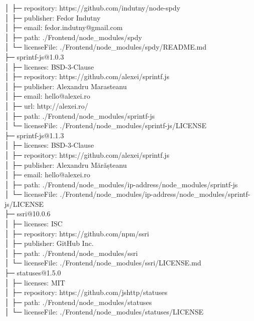 \documentclass[
    paper=a4,
    twoside=false,
    parskip=half,
    listof=entryprefix,
    listof=totoc,
    index=totoc,
    bibliography=totoc,
    headsepline,
]{scrbook}
\begin{document}
    │  ├─ repository: https://github.com/indutny/node-spdy\\
    │  ├─ publisher: Fedor Indutny\\
    │  ├─ email: fedor.indutny@gmail.com\\
    │  ├─ path: ./Frontend/node\_modules/spdy\\
    │  └─ licenseFile: ./Frontend/node\_modules/spdy/README.md\\
    ├─ sprintf-js@1.0.3\\
    │  ├─ licenses: BSD-3-Clause\\
    │  ├─ repository: https://github.com/alexei/sprintf.js\\
    │  ├─ publisher: Alexandru Marasteanu\\
    │  ├─ email: hello@alexei.ro\\
    │  ├─ url: http://alexei.ro/\\
    │  ├─ path: ./Frontend/node\_modules/sprintf-js\\
    │  └─ licenseFile: ./Frontend/node\_modules/sprintf-js/LICENSE\\
    ├─ sprintf-js@1.1.3\\
    │  ├─ licenses: BSD-3-Clause\\
    │  ├─ repository: https://github.com/alexei/sprintf.js\\
    │  ├─ publisher: Alexandru Mărășteanu\\
    │  ├─ email: hello@alexei.ro\\
    │  ├─ path: ./Frontend/node\_modules/ip-address/node\_modules/sprintf-js\\
    │  └─ licenseFile: ./Frontend/node\_modules/ip-address/node\_modules/sprintf-js/LICENSE\\
    ├─ ssri@10.0.6\\
    │  ├─ licenses: ISC\\
    │  ├─ repository: https://github.com/npm/ssri\\
    │  ├─ publisher: GitHub Inc.\\
    │  ├─ path: ./Frontend/node\_modules/ssri\\
    │  └─ licenseFile: ./Frontend/node\_modules/ssri/LICENSE.md\\
    ├─ statuses@1.5.0\\
    │  ├─ licenses: MIT\\
    │  ├─ repository: https://github.com/jshttp/statuses\\
    │  ├─ path: ./Frontend/node\_modules/statuses\\
    │  └─ licenseFile: ./Frontend/node\_modules/statuses/LICENSE\\
\end{document}
